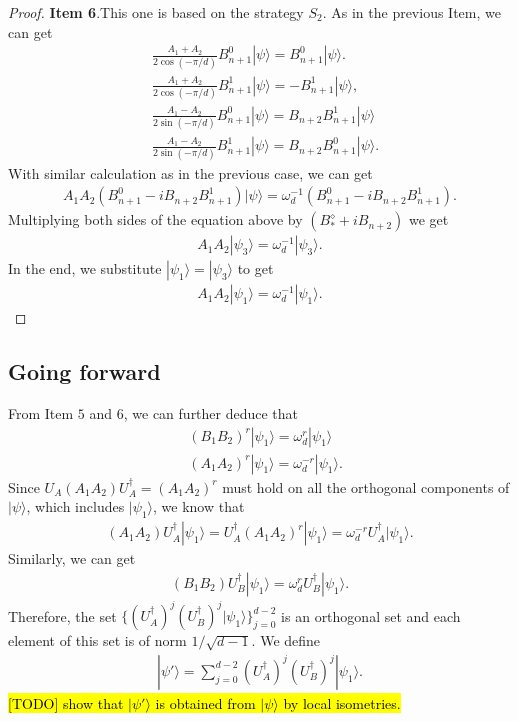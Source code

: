 \documentclass[11pt,letterpaper]{article}
\newcommand{\ket}[1]{|#1\rangle}
\newcommand{\ct}{^{\dagger}}
\newcommand{\1}{\mathbb{1}}
\theoremstyle{definition}
\begin{document}
\begin{proof}
	\textbf{Item 6}.This one is based on the strategy $S_2$. As in the previous Item,
	we can get
	\begin{align}
		&\frac{A_1+A_2}{2 \cos(-\pi/d)} B_{n+1}^0 \ket{\psi} = B_{n+1}^0 \ket{\psi}.\\
		&\frac{A_1+A_2}{2 \cos(-\pi/d)} B_{n+1}^1 \ket{\psi} = -B_{n+1}^1 \ket{\psi},\\
		&\frac{A_1-A_2}{2 \sin(-\pi/d)} B_{n+1}^0\ket{\psi} =B_{n+2} B_{n+1}^1\ket{\psi}\\
		&\frac{A_1 -A_2}{2\sin(-\pi/d)} B_{n+1}^1 \ket{\psi} = B_{n+2} B_{n+1}^0 \ket{\psi}.
	\end{align}
	With similar calculation as in the previous case, we can get 
	\begin{align}
		A_1A_2 (B_{n+1}^0 - i B_{n+2}B_{n+1}^1) \ket{\psi} = \omega_d^{-1} (B_{n+1}^0 - i B_{n+2}B_{n+1}^1).
	\end{align}
	Multiplying both sides of the equation above by $(B_\ast^\diamond+iB_{n+2})$ we get
	\begin{align}
		A_1A_2 \ket{\psi_3} = \omega_d^{-1}\ket{\psi_3}.
	\end{align}
	In the end, we substitute $\ket{\psi_1} = \ket{\psi_3}$ to get
	\begin{align}
		A_1A_2 \ket{\psi_1} = \omega_d^{-1}\ket{\psi_1}.
	\end{align}
\end{proof}
\subsection{Going forward}
From Item $5$ and $6$, we can further deduce that 
\begin{align}
	&(B_1B_2)^r \ket{\psi_1} = \omega_d^r \ket{\psi_1} \\
	&(A_1A_2)^r \ket{\psi_1} = \omega_d^{-r} \ket{\psi_1}.
\end{align}
Since $U_A(A_1A_2)U_A\ct = (A_1A_2)^r$ must hold on all the orthogonal components of $\ket{\psi}$, which includes $\ket{\psi_1}$,
we know that 
\begin{align}
	(A_1A_2)U_A\ct \ket{\psi_1} = U_A\ct (A_1A_2)^r \ket{\psi_1} = \omega_d^{-r} U_A\ct \ket{\psi_1}.
\end{align}
Similarly, we can get 
\begin{align}
	(B_1B_2)U_B\ct \ket{\psi_1} = \omega_d^r U_B\ct \ket{\psi_1}.
\end{align}
Therefore, the set $\{ (U_A\ct)^j(U_B\ct)^j \ket{\psi_1}\}_{j=0}^{d-2}$ is an orthogonal set and
each element of this set is of norm $1/\sqrt{d-1}$.
We define 
\begin{align}
	\ket{\psi'} = \sum_{j=0}^{d-2} (U_A\ct)^j(U_B\ct)^j \ket{\psi_1}.
\end{align} 
\hl{[TODO] show that $\ket{\psi'}$ is obtained from $\ket{\psi}$ by local isometries.}
\end{document}
